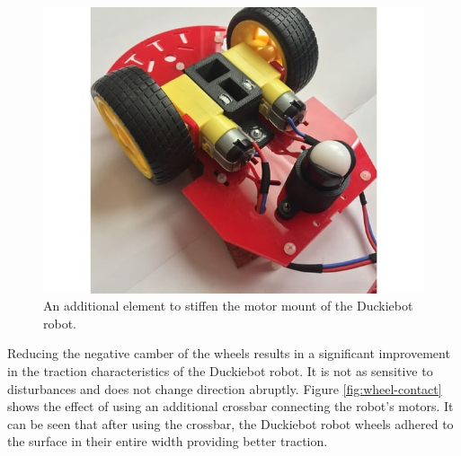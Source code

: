 \documentclass[conference]{IEEEtran}
\begin{document}
\begin{figure}[ht!]
    \centering
    \includegraphics[width=1.0\columnwidth]{img/duckie-th.jpeg}
    \caption{An additional element to stiffen the motor mount of the Duckiebot robot.}
    \label{fig:stiffening-element}
\end{figure}

Reducing the negative camber of the wheels results in a significant improvement in the traction characteristics of the Duckiebot robot. It is not as sensitive to disturbances and does not change direction abruptly. Figure \ref{fig:wheel-contact} shows the effect of using an additional crossbar connecting the robot's motors. It can be seen that after using the crossbar, the Duckiebot robot wheels adhered to the surface in their entire width providing better traction.
\end{document}
